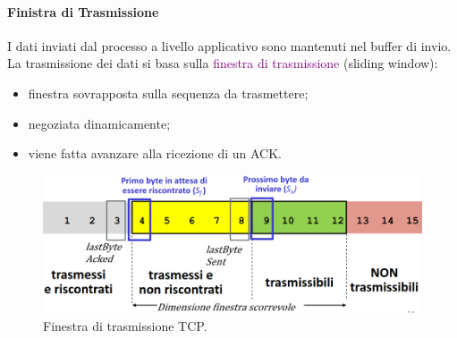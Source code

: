 \paragraph{Finistra di Trasmissione}
I dati inviati dal processo a livello applicativo sono mantenuti nel buffer di invio.
La trasmissione dei dati si basa sulla \textcolor{purple}{finestra di trasmissione} (sliding window):
\begin{itemize}
    \item finestra sovrapposta sulla sequenza da trasmettere;
    \item negoziata dinamicamente;
    \item viene fatta avanzare alla ricezione di un ACK.
\end{itemize}
\begin{figure}[h]
    \centering
    \includegraphics[scale=0.35]{Immagini/FinestraDiTrasmissione.png}
    \caption{Finestra di trasmissione TCP.}
\end{figure}

